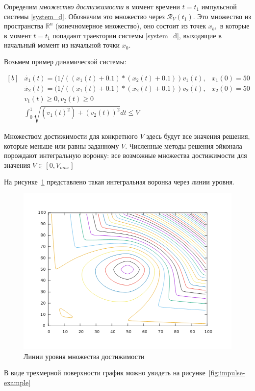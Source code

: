 Определим \emph{множество достижимости} в момент  времени $t=t_1$
импульсной системы \eqref{system_d}. Обозначим это множество через 
$ {\mathcal R}_V(t_1)$. Это множество из  пространства ${\mathbb R}^n$
(конечномерное  множество), оно состоит из точек $x_b,$ в  которые в
момент $t=t_1$ попадают траектории  системы \eqref{system_d}, выходящие
в начальный  момент из начальной точки $x_0$.

Возьмем пример динамической системы:

\begin{equation*}
  \begin{aligned}[b]
    &\dot{x_1}(t) = (1/((x_1(t)+0.1) * (x_2(t)+0.1))v_1(t), & x_1(0)=50\\
    &\dot{x_2}(t) = (1/((x_1(t)+0.1) * (x_2(t)+0.1))v_2(t), & x_2(0) = 50\\[8pt]
    &v_1(t) \ge 0, v_2(t) \ge 0 \\
    &\int_{0}^{1} \sqrt{(v_1(t)^2) + (v_2(t))^2} dt \le V
  \end{aligned}
\end{equation*}

Множеством достижимости для конкретного $V$ здесь будут все значения
решения, которые меньше или равны заданному $V$. Численные методы
решения эйконала порождают интегральную воронку: все возможные
множества достижимости для значения $V \in [0,V_{max}]$

На рисунке~\ref{fig:impulse-example-levels} представлено такая
интегральная воронка через линии уровня.

\begin{figure}[H]
  \centering
  \includegraphics[width=0.5\linewidth]{img/impulse-example-levels.png}
  \hfil \caption{Линии уровня множества достижимости}
  \label{fig:impulse-example-levels}
\end{figure}

В виде трехмерной поверхности график можно увидеть на
рисунке~\ref{fig:impulse-example}

